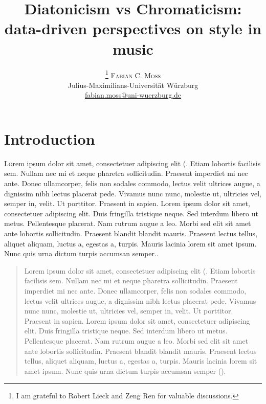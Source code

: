 \documentclass[twoside,onecolumn]{article}
\title{Diatonicism vs Chromaticism: data-driven perspectives on style in music}
\author{
\thanks {I am grateful to Robert Lieck and Zeng Ren for valuable discussions.}
\textsc{Fabian C. Moss}\\ %
\normalsize  {Julius-Maximilians-Universität Würzburg}\\
\ttfamily
\normalsize \href{mailto:fabian.moss@uni-wuerzburg.de}
{fabian.moss@uni-wuerzburg.de} \\%
\normalfont
}
\date{} %
\begin{document}
\maketitle


\section{Introduction}\label{sec:intro}

\lettrine[nindent=0em,lines=3] {L}orem ipsum dolor sit amet, consectetuer adipiscing elit (\cite[p. 34-39]{Figueredo:2009}. Etiam lobortis facilisis sem. Nullam nec mi et neque pharetra sollicitudin. Praesent imperdiet mi nec ante. Donec ullamcorper, felis non sodales commodo, lectus velit ultrices augue, a dignissim nibh lectus placerat pede. Vivamus nunc nunc, molestie ut, ultricies vel, semper in, velit. Ut porttitor. Praesent in sapien. Lorem ipsum dolor sit amet, consectetuer adipiscing elit. Duis fringilla tristique neque. Sed interdum libero ut metus. Pellentesque placerat. Nam rutrum augue a leo. Morbi sed elit sit amet ante lobortis sollicitudin. Praesent blandit blandit mauris. Praesent lectus tellus, aliquet aliquam, luctus a, egestas a, turpis. Mauris lacinia lorem
sit amet ipsum. Nunc quis urna dictum turpis accumsan semper..

\begin{quote}
Lorem ipsum dolor sit amet, consectetuer adipiscing elit (\cite[p. 34-39]{Figueredo:2009}. Etiam lobortis facilisis sem. Nullam nec mi et neque pharetra sollicitudin. Praesent imperdiet mi nec ante. Donec ullamcorper, felis non sodales commodo, lectus velit ultrices augue, a dignissim nibh lectus placerat pede. Vivamus nunc nunc, molestie ut, ultricies vel, semper in, velit. Ut porttitor. Praesent in sapien. Lorem ipsum dolor sit amet, consectetuer adipiscing elit. Duis fringilla tristique neque. Sed interdum libero ut metus. Pellentesque placerat. Nam rutrum augue a leo. Morbi sed elit sit amet ante lobortis sollicitudin. Praesent blandit blandit mauris. Praesent lectus tellus, aliquet aliquam, luctus a, egestas a, turpis. Mauris lacinia lorem
sit amet ipsum. Nunc quis urna dictum turpis accumsan semper (\cite[p. 2]{Berry:1976}).
\end{quote}

\blindtext %
\end{document}
